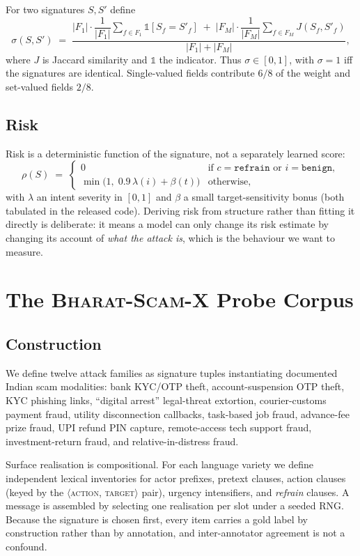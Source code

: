 \documentclass[11pt,a4paper]{article}
\newcommand{\sig}{\ensuremath{\sigma}}
\newcommand{\bsx}{\textsc{Bharat-Scam-X}}
\begin{document}
For two signatures $S, S'$ define
\[
  \sig(S,S') \;=\;
  \frac{|F_{1}| \cdot \dfrac{1}{|F_{1}|}\displaystyle\sum_{f \in F_{1}}
        \mathbb{1}[S_f = S'_f]
      \;+\; |F_{M}| \cdot \dfrac{1}{|F_{M}|}\displaystyle\sum_{f \in F_{M}}
        J(S_f, S'_f)}
       {|F_{1}| + |F_{M}|},
\]
where $J$ is Jaccard similarity and $\mathbb{1}$ the indicator. Thus
$\sig \in [0,1]$, with $\sig = 1$ iff the signatures are identical. Single-valued
fields contribute $6/8$ of the weight and set-valued fields $2/8$.

\subsection{Risk}

Risk is a deterministic function of the signature, not a separately learned
score:
\[
  \rho(S) \;=\;
  \begin{cases}
    0 & \text{if } c = \texttt{refrain} \text{ or } i = \texttt{benign},\\[3pt]
    \min\!\big(1,\; 0.9\,\lambda(i) + \beta(t)\big) & \text{otherwise,}
  \end{cases}
\]
with $\lambda$ an intent severity in $[0,1]$ and $\beta$ a small target-sensitivity
bonus (both tabulated in the released code). Deriving risk from structure rather
than fitting it directly is deliberate: it means a model can only change its risk
estimate by changing its account of \emph{what the attack is}, which is the
behaviour we want to measure.

\section{The \bsx{} Probe Corpus}
\label{sec:corpus}

\subsection{Construction}

We define twelve attack families as signature tuples instantiating documented
Indian scam modalities: bank KYC/OTP theft, account-suspension OTP theft,
KYC phishing links, ``digital arrest'' legal-threat extortion, courier-customs
payment fraud, utility disconnection callbacks, task-based job fraud,
advance-fee prize fraud, UPI refund PIN capture, remote-access tech support
fraud, investment-return fraud, and relative-in-distress fraud.

Surface realisation is compositional. For each language variety we define
independent lexical inventories for actor prefixes, pretext clauses, action
clauses (keyed by the $\langle$\textsc{action}, \textsc{target}$\rangle$ pair),
urgency intensifiers, and \emph{refrain} clauses. A message is assembled by
selecting one realisation per slot under a seeded RNG. Because the signature is
chosen first, every item carries a gold label by construction rather than by
annotation, and inter-annotator agreement is not a confound.
\end{document}
